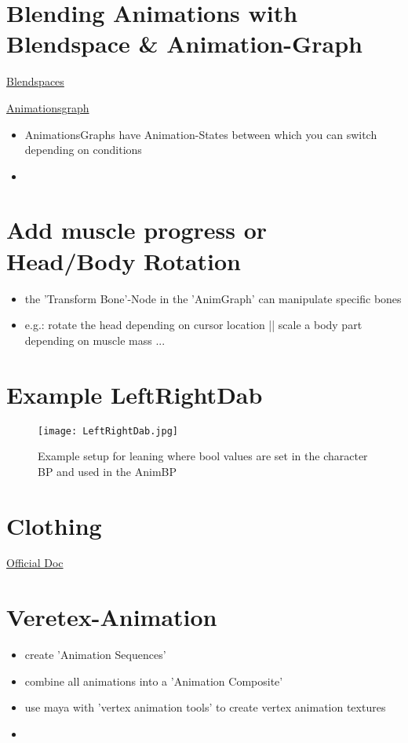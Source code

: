     \section{Blending Animations with Blendspace \& Animation-Graph}
        \uline{Blendspaces}

    \smallskip
        \uline{Animationsgraph}
        \begin{itemize}
            \item AnimationsGraphs have Animation-States between which you can switch depending on conditions
            \item 
        \end{itemize}


    \section{Add muscle progress or Head/Body Rotation}
        \begin{itemize}
            \item the 'Transform Bone'-Node in the 'AnimGraph' can manipulate specific bones
            \item e.g.: rotate the head depending on cursor location || scale a body part depending on muscle mass ...
        \end{itemize}


    \section{Example LeftRightDab}
        \begin{figure}
            \texttt{[image: LeftRightDab.jpg]}
            \caption{Example setup for leaning where bool values are set in the character BP and used in the AnimBP}
        \end{figure}


    \section{Clothing}
        \href{https://docs.unrealengine.com/4.27/en-US/InteractiveExperiences/Physics/Cloth/Overview/}{Official Doc}


    \section{Veretex-Animation}
        \begin{itemize}
            \item create 'Animation Sequences'
            \item combine all animations into a 'Animation Composite'
            \item use maya with 'vertex animation tools' to create vertex animation textures %
            \item 
        \end{itemize}


